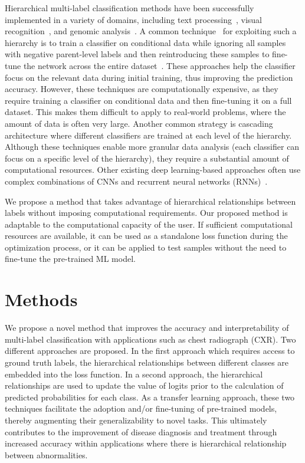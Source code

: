 Hierarchical multi-label classification methods have been successfully implemented in a variety of domains, including text processing~\cite{aly_Hierarchical_2019}, visual recognition~\cite{bi_Mandatory_2014}, and genomic analysis~\cite{bi_BayesOptimal_2015}. A common technique~\cite{chen_Deep_2019} for exploiting such a hierarchy is to train a classifier on conditional data while ignoring all samples with negative parent-level labels and then reintroducing these samples to fine-tune the network across the entire dataset~\cite{chen_Deep_2019}. These approaches help the classifier focus on the relevant data during initial training, thus improving the prediction accuracy.  However, these techniques are computationally expensive, as they require training a classifier on conditional data and then fine-tuning it on a full dataset. This makes them difficult to apply to real-world problems, where the amount of data is often very large.   Another common strategy is cascading architecture where different classifiers are trained at each level of the hierarchy. Although these techniques enable more granular data analysis (each classifier can focus on a specific level of the hierarchy), they require a substantial amount of computational resources. Other existing deep learning-based approaches often use complex combinations of CNNs and recurrent neural networks (RNNs)~\cite{guo_CNNRNN_2018,kowsari_HDLTex_2017}.

We propose a method that takes advantage of hierarchical relationships between labels without imposing computational requirements. Our proposed method is adaptable to the computational capacity of the user. If sufficient computational resources are available, it can be used as a standalone loss function during the optimization process, or it can be applied to test samples without the need to fine-tune the pre-trained ML model. 

\section{Methods}\label{sec:methods}
We propose a novel method that improves the accuracy and interpretability of multi-label classification with applications such as chest radiograph (CXR). Two different approaches are proposed.  In the first approach which requires access to ground truth labels, the hierarchical relationships between different classes are embedded into the loss function. In a second approach, the hierarchical relationships are used to update the value of logits prior to the calculation of predicted probabilities for each class.  As a transfer learning approach, these two techniques facilitate the adoption and/or fine-tuning of pre-trained models, thereby augmenting their generalizability to novel tasks. This ultimately contributes to the improvement of disease diagnosis and treatment through increased accuracy within applications where there is hierarchical relationship between abnormalities.

